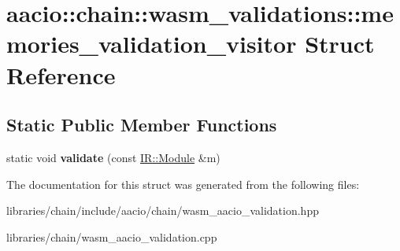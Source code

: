 \hypertarget{structaacio_1_1chain_1_1wasm__validations_1_1memories__validation__visitor}{}\section{aacio\+:\+:chain\+:\+:wasm\+\_\+validations\+:\+:memories\+\_\+validation\+\_\+visitor Struct Reference}
\label{structaacio_1_1chain_1_1wasm__validations_1_1memories__validation__visitor}
\subsection*{Static Public Member Functions}
\begin{DoxyCompactItemize}
\item 
\mbox{\label{structaacio_1_1chain_1_1wasm__validations_1_1memories__validation__visitor_af87c72e7031049f637bc91d4c1046c1a}} 
static void {\bfseries validate} (const \mbox{\hyperlink{struct_i_r_1_1_module}{I\+R\+::\+Module}} \&m)
\end{DoxyCompactItemize}


The documentation for this struct was generated from the following files\+:\begin{DoxyCompactItemize}
\item 
libraries/chain/include/aacio/chain/wasm\+\_\+aacio\+\_\+validation.\+hpp\item 
libraries/chain/wasm\+\_\+aacio\+\_\+validation.\+cpp\end{DoxyCompactItemize}
